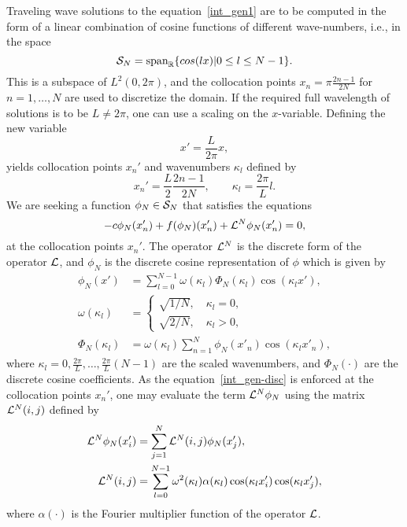 Traveling wave solutions to the equation~\eqref{int_gen1}
are to be computed in the form of a linear combination of cosine functions of different
wave-numbers, i.e., in the space
\begin{equation}
\mathcal{S}_N = \mbox{span}_{\mathbb{R}}\{ cos(lx) | 0 \leq l \leq N-1 \}
.
\end{equation}
This is a subspace of $L^2(0,2\pi)$, and the collocation points 
$x_n = \pi \frac{2n -1}{2N}$ for $n = 1,\dots, N$ are used to discretize the domain.  
If the required full wavelength of solutions is to be $L \neq 2\pi$, 
one can use a scaling on the $x$-variable. 
Defining the new variable
\begin{equation*}
x' = \frac{L}{2\pi}x, 
\end{equation*}
yields collocation points $x_n'$ and wavenumbers $\kappa_l$ defined by
\begin{equation*}
x_n' = \frac{L}{2} \frac{2n -1}{2N}, \quad\quad \kappa_l = \frac{2\pi}{L}l. 
\end{equation*}
We are seeking a function $\phi_N \in \mathcal{S}_N$ that satisfies the equations
\begin{equation}
-c\phi_N(x_n') + f(\phi_N)(x_n') + \mathcal{L}^N\phi_N(x_n') = 0, \label{int_gen-disc}
\end{equation}
at the collocation points $x_n'$.
The operator $\mathcal{L}^N$ is the discrete form of the operator $\mathcal{L}$, 
and $\phi_N$ is the discrete cosine representation of $\phi$
which is given by
\begin{align*}
\phi_N(x') &= \sum_{l = 0}^{N-1} \omega(\kappa_l)\Phi_N(\kappa_l)\cos(\kappa_{l}x'),\\
\omega(\kappa_l) &= 
\begin{cases}
\sqrt{1/N}, \quad \kappa_l = 0, \\
\sqrt{2/N}, \quad \kappa_l > 0,
\end{cases}                  \\
\Phi_N(\kappa_l) &= \omega(\kappa_l) \sum_{n = 1}^{N} \phi_N(x'_n) \cos(\kappa_l x'_n),
\end{align*}
where $\kappa_l = 0,\frac{2\pi}{L},\ldots, \frac{2\pi}{L}(N-1)$ are the scaled wavenumbers,
and $\Phi_N(\cdot)$ are the discrete cosine coefficients.
As the equation~\eqref{int_gen-disc} is enforced at the collocation points $x_n'$, 
one may evaluate the term $\mathcal{L}^N\phi_N$ using the matrix $\mathcal{L}^N(i,j)$ 
defined by
\begin{align*}
\mathcal{L}^N\phi_N(x'_i) &= \sum_{j=1}^{N}\mathcal{L}^N(i,j) \phi_N(x'_j),\\
\mathcal{L}^N(i,j) &= \sum_{l=0}^{N-1} \omega^2(\kappa_l) \alpha(\kappa_l) \cos(\kappa_l x'_i) \cos(\kappa_l x'_j),
\end{align*}
where $\alpha(\cdot)$ is the Fourier multiplier function of the operator $\mathcal{L}$.




